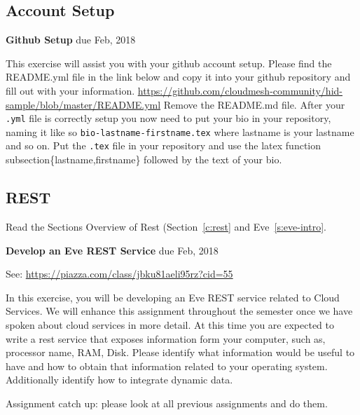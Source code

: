 \subsection{Account Setup}

\begin{exercise} {\bf Github Setup} due Feb, 2018

This exercise will assist you with your github account setup. Please
find the README.yml file in the link below and copy it into your
github repository and fill out with your
information. \url{https://github.com/cloudmesh-community/hid-sample/blob/master/README.yml}
Remove the README.md file. After your \verb|.yml| file is correctly setup you
now need to put your bio in your repository, naming it like so
\verb|bio-lastname-firstname.tex| where lastname is your lastname and so
on. Put the \verb|.tex| file in your repository and use the latex function
subsection\{lastname,firstname\} followed by the text of your bio.


\end{exercise}

\subsection{REST}
\begin{exercise}
Read the Sections Overview of Rest (Section~\ref{c:rest} and Eve~\ref{s:eve-intro}.
\end{exercise}

\begin{exercise} {\bf Develop an Eve REST Service} due Feb, 2018

See: \url{https://piazza.com/class/jbku81aeli95rz?cid=55}

In this exercise, you will be developing an Eve REST service related
to Cloud Services. We will enhance this assignment throughout the
semester once we have spoken about cloud services in more detail. At
this time you are expected to write a rest service that exposes
information form your computer, such as, processor name, RAM,
Disk. Please identify what information would be useful to have and how
to obtain that information related to your operating
system. Additionally identify how to integrate dynamic data.


\end{exercise}

\begin{exercise}
Assignment catch up: please look at all previous assignments and do
them. 
\end{exercise}

